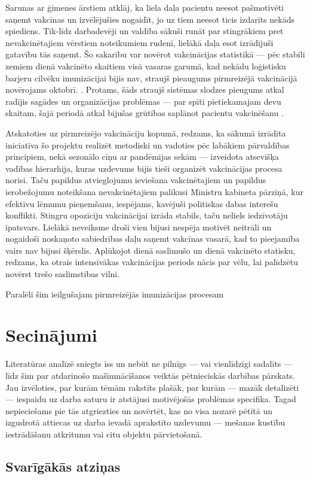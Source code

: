\documentclass[12pt, a4paper]{article}
\numberwithin{equation}{section} %
\begin{document}
Sarunas ar ģimenes ārstiem atklāj, ka liela daļa pacientu neesot pašmotivēti saņemt vakcīnas un izvēlējušies nogaidīt, jo uz tiem neesot ticis izdarīts nekāds spiediens. Tik-līdz darbadevēji un valdība sākuši runāt par stingrākiem pret nevakcinētajiem vērstiem noteikumiem rudenī, lielākā daļa esot izrādījuši gatavību tās saņemt. Šo sakarību var novērot vakcinācijas statistikā --- pēc stabili zemiem dienā vakcinēto skaitiem visā vasaras garumā, kad nekādu loģistisku barjeru cilvēku imunizācijai bijis nav, straujš pieaugums pirmreizējā vakcinācijā novērojams oktobrī. \cite{vaxx_stats}. Protams, šāds straujš sistēmas slodzes pieugums atkal radījis sagādes un organizācijas problēmas --- par spīti pietiekamajam devu skaitam, šajā periodā atkal bijušas grūtības saplānot pacientu vakcinēšanu \cite{vaxx_unavailable}.

Atskatoties uz pirmreizējo vakcināciju kopumā, redzams, ka sākumā izrādīta iniciatīva šo projektu realizēt metodiski un vadoties pēc labākiem pārvaldības principiem, nekā sezonālo cīņu ar pandēmijas sekām --- izveidota atsevišķa vadības hierarhija, kuras uzdevums bijis tieši organizēt vakcinācijas procesa norisi. Taču papildus atvieglojumu ieviešana vakcinētajiem un papildus ierobežojumu noteikšana nevakcinētajiem palikusi Ministru kabineta pārziņā, kur efektīvu lēmumu pieņemšanu, iespējams, kavējuši politiskas dabas interešu konflikti. Stingru opozīciju vakcinācijai izrāda stabils, taču neliels iedzīvotāju īpatsvars. Lielākā neveiksme droši vien bijusi nespēja motivēt neitrāli un nogaidoši noskaņoto sabiedrības daļu saņemt vakcīnas vasarā, kad to pieejamība vairs nav bijusi šķērslis. Aplūkojot dienā saslimušo \cite{lv_stats} un dienā vakcinēto \cite{vaxx_stats} statisku, redzams, ka otrais intensīvākas vakcinācijas periods nācis par vēlu, lai palīdzētu novērst trešo saslimstības vilni.

Paralēli šim ieilgušajam pirmreizējās imunizācijas procesam 

\newpage
\section{Secinājumi}

Literatūras analīzē sniegts īss un nebūt ne pilnīgs --- vai vienlīdzīgi sadalīts --- līdz šim par atdarinošo mašīnmācīšanos veiktās pētnieciskās darbības pārskats. Jau izvēloties, par kurām tēmām rakstīts plašāk, par kurām --- mazāk detalizēti --- iespaidu uz darba saturu ir atstājusi motivējošās problēmas specifika. Tagad nepieciešams pie tās atgriezties un novērtēt, kas no visa nozarē pētītā un izgudrotā attiecas uz darba ievadā aprakstīto uzdevumu --- mešanas kustību iestrādāšanu atkritumu vai citu objektu pārvietošanā.

\subsection{Svarīgākās atziņas}


\newpage
{}
\printbibliography[title=Atsauces]
\end{document}
